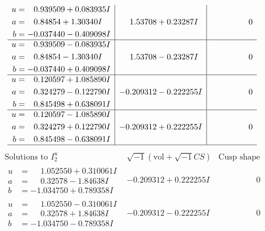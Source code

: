 \documentclass[1p]{elsarticle_modified}
\theoremstyle{definition}
\newcommand{\I}{\sqrt{-1}}
\begin{document}
$$\begin{array}{c|c|c}
\begin{aligned}
u &= \phantom{-}0.939509 + 0.083935 I \\
a &= \phantom{-}0.84854 + 1.30340 I \\
b &= -0.037440 - 0.409098 I\end{aligned}
 & \phantom{-}1.53708 + 0.23287 I & \phantom{-0.000000 } 0 \\ \hline\begin{aligned}
u &= \phantom{-}0.939509 - 0.083935 I \\
a &= \phantom{-}0.84854 - 1.30340 I \\
b &= -0.037440 + 0.409098 I\end{aligned}
 & \phantom{-}1.53708 - 0.23287 I & \phantom{-0.000000 } 0 \\ \hline\begin{aligned}
u &= \phantom{-}0.120597 + 1.085890 I \\
a &= \phantom{-}0.324279 - 0.122790 I \\
b &= \phantom{-}0.845498 + 0.638091 I\end{aligned}
 & -0.209312 - 0.222255 I & \phantom{-0.000000 } 0 \\ \hline\begin{aligned}
u &= \phantom{-}0.120597 - 1.085890 I \\
a &= \phantom{-}0.324279 + 0.122790 I \\
b &= \phantom{-}0.845498 - 0.638091 I\end{aligned}
 & -0.209312 + 0.222255 I & \phantom{-0.000000 } 0\\
 \hline 
 \end{array}$$\newpage$$\begin{array}{c|c|c}  
\text{Solutions to }I^u_{2}& \I (\text{vol} + \sqrt{-1}CS) & \text{Cusp shape}\\
 \hline 
\begin{aligned}
u &= \phantom{-}1.052550 + 0.310061 I \\
a &= \phantom{-}0.32578 - 1.84638 I \\
b &= -1.034750 + 0.789358 I\end{aligned}
 & -0.209312 + 0.222255 I & \phantom{-0.000000 } 0 \\ \hline\begin{aligned}
u &= \phantom{-}1.052550 - 0.310061 I \\
a &= \phantom{-}0.32578 + 1.84638 I \\
b &= -1.034750 - 0.789358 I\end{aligned}
 & -0.209312 - 0.222255 I & \phantom{-0.000000 } 0 \\ \hline\begin{aligned}

\end{aligned}
\end{array}$$
\end{document}

